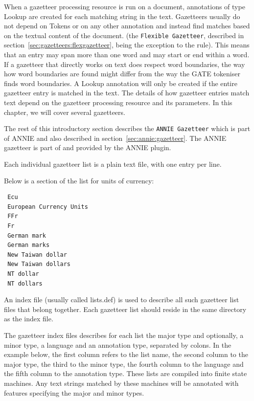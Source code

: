 When a gazetteer processing resource is run on a document, annotations of type Lookup
are created for each matching string in the text. Gazetteers usually do not
depend on Tokens or on any other annotation and instead find matches based
on the textual content of the document.
(the \texttt{Flexible Gazetteer}, described in section~\ref{sec:gazetteers:flexgazetteer},
 being the exception to the rule). 
This means that an entry may span
more than one word and may start or end within a word. If a gazetteer that
directly works on text does
respect word boundaries, the way how word boundaries are found might differ
from the way the GATE tokeniser finds word boundaries.
A Lookup annotation will only be created if the entire gazetteer entry
is matched in the text. The details of how gazetteer
entries match text depend on the gazetteer processing resource and its 
parameters. In this chapter, we will cover several gazetteers.


The rest of this introductory section describes the 
\texttt{ANNIE Gazetteer} which is part of ANNIE and also described 
in section~\ref{sec:annie:gazetteer}. The ANNIE gazetteer is part of and provided
by the ANNIE plugin.


Each individual gazetteer list is a plain text file, with one entry per line. 

Below is a section of the list for units of currency: 
\begin{small}\begin{verbatim}
 Ecu  
 European Currency Units  
 FFr  
 Fr  
 German mark  
 German marks  
 New Taiwan dollar  
 New Taiwan dollars  
 NT dollar  
 NT dollars 
\end{verbatim}\end{small}

An index file (usually called lists.def) is used to describe all such 
gazetteer list files that belong together. 
Each gazetteer list should reside in the same directory as the
index file. 

The gazetteer index files describes for each list the major type
and optionally, a minor type, a language and an annotation type, 
separated by colons.  In the example below, the first column refers to
the list name, the second column to the major type, the third to the
minor type, the fourth column to the language and the fifth column
to the annotation type. These lists are compiled into finite state 
machines. Any text strings matched by these machines will be 
annotated with features specifying the major and minor types. 

